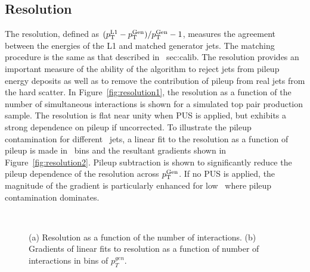 \subsection{Resolution}

The resolution, defined as $({p_{\text T}^{\text{L1}}}-{p_{\text T}^{\text{Gen}}})/{p_{\text T}^{\text{Gen}}} - 1$, measures the agreement between the energies of the 
L1 and matched generator jets. The matching procedure is the same as that described in \Section~{sec:calib}.
The resolution provides an important measure of the ability of the algorithm to reject jets from pileup
energy deposits as well as to remove the contribution of pileup from real jets from the hard scatter.
In Figure~\ref{fig:resolution1}, the resolution as a function of the number of simultaneous interactions is shown for
a simulated top pair production sample. The resolution is flat near unity when PUS is applied,
but exhibits a strong dependence on pileup if uncorrected. To illustrate the pileup contamination for different
\Genpt~jets, a linear fit to the resolution as a function of pileup is made in \Genpt~bins and the resultant gradients
shown in Figure~\ref{fig:resolution2}. Pileup subtraction is shown to significantly reduce the 
pileup dependence of the resolution across ${p_{\text T}^{\text{Gen}}}$. If no PUS is applied, the magnitude of the gradient is
particularly enhanced for low \Genpt~where pileup contamination dominates. 

\begin{figure}
    \begin{center} 
	~
	\caption{(a) Resolution as a function of the number of interactions. (b) Gradients of linear fits to 
	    resolution as a function of number of interactions in bins of $p^{gen}_{T}$.}
	    \label{fig:label:resolution}
    \end{center} 
\end{figure}

